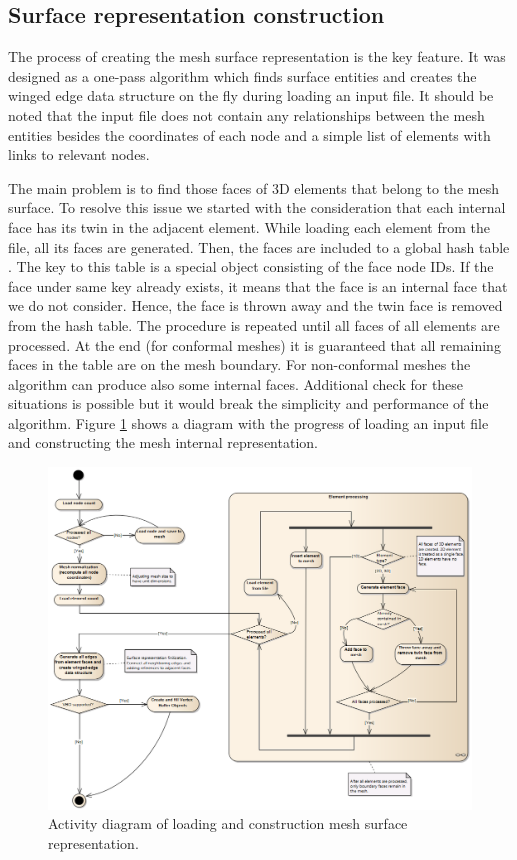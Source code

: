 \subsection{Surface representation construction}

The process of creating the mesh surface representation is the key feature. It was designed as a one-pass algorithm which finds surface entities and creates the winged edge data structure on the fly during loading an input file. It should be noted that the input file does not contain any relationships between the mesh entities besides the coordinates of each node and a simple list of elements with links to relevant nodes.

The main problem is to find those faces of 3D elements that belong to the mesh surface. To resolve this issue we started with the consideration that each internal face has its twin in the adjacent element. While loading each element from the file, all its faces are generated. Then, the faces are included to a global hash table \cite{XXX-7}. The key to this table is a special object consisting of the face node IDs. If the face under same key already exists, it means that the face is an internal face that we do not consider. Hence, the face is thrown away and the twin face is removed from the hash table. The procedure is repeated until all faces of all elements are processed. At the end (for conformal meshes) it is guaranteed that all remaining faces in the table are on the mesh boundary. For non-conformal meshes the algorithm can produce also some internal faces. Additional check for these situations is possible but it would break the simplicity and performance of the algorithm. Figure \ref{fig:mesh-construction} shows a diagram with the progress of loading an input file and constructing the mesh internal representation.

\begin{figure}[H]
\centering
\includegraphics[width=\textwidth]{figures/chapter-mesh-visualization/figure6}
\decoRule
\caption[Activity diagram of mesh construction]{Activity diagram of loading and construction mesh surface representation.}
\label{fig:mesh-construction}
\end{figure}

